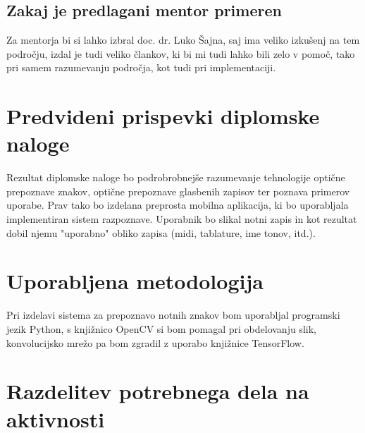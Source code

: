 \documentclass[11pt,a4paper]{article}
\begin{document}
\subsection{Zakaj je predlagani mentor primeren}

Za mentorja bi si lahko izbral doc. dr. Luko Šajna, saj ima veliko izkušenj na tem področju, izdal je tudi veliko člankov, ki bi mi tudi lahko bili zelo v pomoč, tako pri samem razumevanju področja, kot tudi pri implementaciji.


\section{Predvideni prispevki diplomske naloge}

Rezultat diplomske naloge bo podrobrobnejše razumevanje tehnologije optične prepoznave znakov, optične prepoznave glasbenih zapisov ter poznava primerov uporabe. Prav tako bo izdelana preprosta mobilna aplikacija, ki bo uporabljala implementiran sistem razpoznave. Uporabnik bo slikal notni zapis in kot rezultat dobil njemu "uporabno" obliko zapisa (midi, tablature, ime tonov, itd.).


\section{Uporabljena metodologija}

Pri izdelavi sistema za prepoznavo notnih znakov bom uporabljal programski jezik Python, s knjižnico OpenCV si bom pomagal pri obdelovanju slik, konvolucijsko mrežo pa bom zgradil z uporabo knjižnice TensorFlow.


\section{Razdelitev potrebnega dela na aktivnosti}
\end{document}
